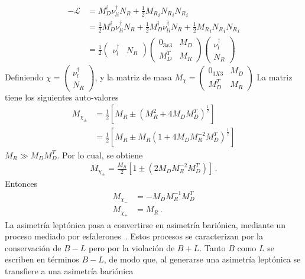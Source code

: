 % 
% 
%
\begin{align}
-\mathcal{L}&=M^{i}_{D}\nu_{li}^{\dagger}N_{R}+\frac{1}{2}{M_R}_{i} {N_R}_i {N_R}_i\nonumber\\
&=\frac{1}{2}M^{i}_{D}\nu_{li}^{\dagger}N_{R}+\frac{1}{2}M^{i}_{D}\nu_{li}^{\dagger}N_{R}+\frac{1}{2}{M_R}_{i} {N_R}_i {N_R}_i\nonumber\\
&=\frac{1}{2} \begin{pmatrix} \nu_{l}^{\dagger}&N_{R}  \end{pmatrix} \begin{pmatrix}
0_{3x3}&M_{D}\\
M^{T}_{D}&M_{R}
\end{pmatrix}\begin{pmatrix} \nu_{l}^{\dagger}\\N_{R}  \end{pmatrix}
\end{align}
Definiendo 
$\chi=\begin{pmatrix} \nu_{l}^{\dagger}\\N_{R}  \end{pmatrix}$, y la matriz de masa 
$M_{\chi}=\begin{pmatrix}0_{3X3}&M_{D}\\M^{T}_{D}&M_{R}  \end{pmatrix}$
La matriz tiene los siguientes auto-valores
\begin{align}
M_{\chi_{\pm}}&=\frac{1}{2}\left[M_{R}\pm(M^{2}_{R}+4M_{D}M^{T}_{D})^{\frac{1}{2}}\right]\nonumber \\
&=\frac{1}{2}\left[M_{R}\pm M_{R}(1+{4M_{D}M^{-2}_{R}M^{T}_{D}})^{\frac{1}{2}}\right]
\end{align}
$M_{R}\gg M_{D}M^{T}_{D}$.
Por lo cual, se obtiene
\begin{align}
M_{\chi_{\pm}}=\frac{M_{R}}{2}[1\pm(2M_{D}M^{-2}_{R}M^{T}_{D})]\, .
\end{align}
Entonces
\begin{align}
M_{\chi_{-}}&=-M_{D}M^{-1}_{R}M^{T}_{D}\nonumber \\
M_{\chi_{+}}&=M_{R}\, .
\end{align}
La asimetría leptónica pasa a convertirse en asimetría bariónica, mediante un proceso mediado por esfalerones~\cite{Biswas:2017tce}. Estos procesos se caracterizan por la conservación de $B-L$ pero por la violación de $B+L$. Tanto $B$ como $L$ se escriben en términos $B-L$, de modo que, al generarse una asimetría leptónica se transfiere a una asimetría bariónica 